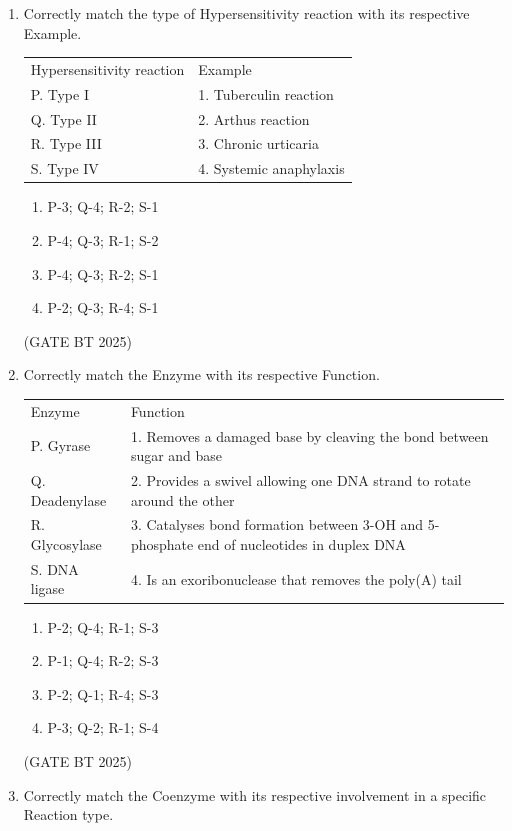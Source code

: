 \documentclass[journal,12pt,onecolumn]{IEEEtran}
\theoremstyle{remark}
\begin{document}
\begin{enumerate}
\item Correctly match the type of Hypersensitivity reaction with its respective Example.  

\begin{tabular}{ll}
Hypersensitivity reaction & Example \\
P. Type I & 1. Tuberculin reaction \\
Q. Type II & 2. Arthus reaction \\
R. Type III & 3. Chronic urticaria \\
S. Type IV & 4. Systemic anaphylaxis
\end{tabular}  

\begin{enumerate}
    \item P-3; Q-4; R-2; S-1
    \item P-4; Q-3; R-1; S-2
    \item P-4; Q-3; R-2; S-1
    \item P-2; Q-3; R-4; S-1
\end{enumerate}  
\hfill (GATE BT 2025)

\item Correctly match the Enzyme with its respective Function.  

\begin{tabular}{ll}
Enzyme & Function \\
P. Gyrase & 1. Removes a damaged base by cleaving the bond between sugar and base \\
Q. Deadenylase & 2. Provides a swivel allowing one DNA strand to rotate around the other \\
R. Glycosylase & 3. Catalyses bond formation between 3-OH and 5-phosphate end of nucleotides in duplex DNA \\
S. DNA ligase & 4. Is an exoribonuclease that removes the poly(A) tail
\end{tabular}  

\begin{enumerate}
    \item P-2; Q-4; R-1; S-3
    \item P-1; Q-4; R-2; S-3
    \item P-2; Q-1; R-4; S-3
    \item P-3; Q-2; R-1; S-4
\end{enumerate}  
\hfill (GATE BT 2025)

\item Correctly match the Coenzyme with its respective involvement in a specific Reaction type.\\


\end{enumerate}
\end{document}
